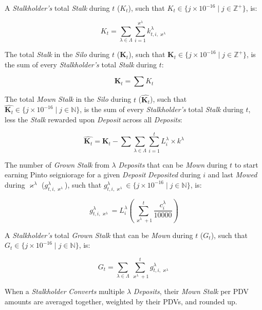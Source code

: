 \documentclass[tikz]{article}
\newcommand{\term}[1]{\textsl{#1}}
\begin{document}
A \term{Stalkholder's} total \term{Stalk} during $t$ ($K_{t}$), such that $K_{t} \in \{j \times 10^{-16} \mid j \in \mathbb{Z}^{+} \}$, is:

    $$
        K_{t} = 
            \sum_{\lambda \in \Lambda}
                \sum_{i=1}^{\varkappa^{\lambda}}
                    k_{t,i,\varkappa^{\lambda}}^{\lambda}
    $$

The total \term{Stalk} in the \term{Silo} during $t$ ($\mathbf{K}_{t}$), such that $\mathbf{K}_{t} \in \{j \times 10^{-16} \mid j \in \mathbb{Z}^{+} \}$, is the sum of every \term{Stalkholder's} total \term{Stalk} during $t$:

    $$
        \mathbf{K}_{t} = 
            \sum{K_{t}}
    $$

\newpage

The total \term{Mown Stalk} in the \term{Silo} during $t$ ($\widehat{\mathbf{K}_{t}}$), such that $\widehat{\mathbf{K}_{t}} \in \{j \times 10^{-16} \mid j \in \mathbb{N} \}$, is the sum of every \term{Stalkholder's} total \term{Stalk} during $t$, less the \term{Stalk} rewarded upon \term{Deposit} across all \term{Deposits}:


    $$
        \widehat{\mathbf{K}_{t}} = 
            \mathbf{K}_{t} - \sum
            \sum_{\lambda \in \Lambda}
                \sum_{i=1}^{t}
                    L_{i}^{\lambda} \times k^{\lambda}
    $$

The number of \term{Grown Stalk} from $\lambda$ \term{Deposits} that can be \term{Mown} during $t$ to start earning Pinto seigniorage for a given \term{Deposit} \term{Deposited} during $i$ and last \term{Mowed} during $\varkappa^{\lambda}$ ($g_{t,i,\varkappa^{\lambda}}^{\lambda}$), such that $g_{t,i,\varkappa^{\lambda}}^{\lambda} \in \{j \times 10^{-16} \mid j \in \mathbb{N} \}$, is:

    $$
        g_{t,i,\varkappa^{\lambda}}^{\lambda} = 
            L_{i}^{\lambda}\left
            (\sum_{\varkappa^{\lambda} + 1}^{t} 
                    \frac{c_{i}^{\lambda}}
                            {10000}
            \right)
    $$

A \term{Stalkholder's} total \term{Grown Stalk} that can be \term{Mown} during $t$ ($G_{t}$), such that $G_{t} \in \{j \times 10^{-16} \mid j \in \mathbb{N} \}$, is:

    $$
        G_{t} = 
            \sum_{\lambda \in \Lambda}
                \sum_{\varkappa^{\lambda} + 1}^{t} 
                    g_{t,i,\varkappa^{\lambda}}^{\lambda}
    $$

When a \term{Stalkholder} \term{Converts} multiple $\lambda$ \term{Deposits}, their \term{Mown Stalk} per PDV amounts are averaged together, weighted by their PDVs, and rounded up.
\end{document}
